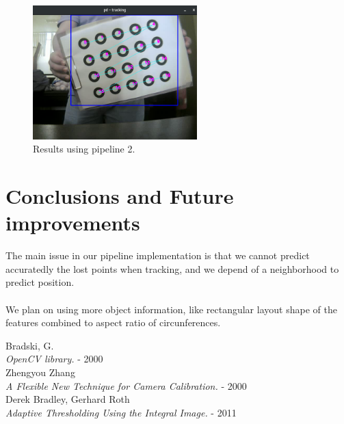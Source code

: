 \documentclass[journal]{IEEEtran}
\begin{document}
%
\begin{figure}[H]
\centering
\includegraphics[width=2.5in]{_img/img_report2_pattern.png}
\caption{Results using pipeline 2.}
\end{figure}
%
\section{Conclusions and Future improvements}
The main issue in our pipeline implementation is that we cannot predict accuratedly the lost points when tracking, and we depend of a neighborhood to predict position.
\\
\\
We plan on using more object information, like rectangular layout shape of the features combined to aspect ratio of circunferences.


\begin{thebibliography}{1}

  Bradski, G. \\
  \textit{OpenCV library.} - 2000
\\
  Zhengyou Zhang \\
  \textit{A Flexible New Technique for Camera Calibration.} - 2000
\\
  Derek Bradley, Gerhard Roth \\
  \textit{Adaptive Thresholding Using the Integral Image.} - 2011


\end{thebibliography}
\end{document}
